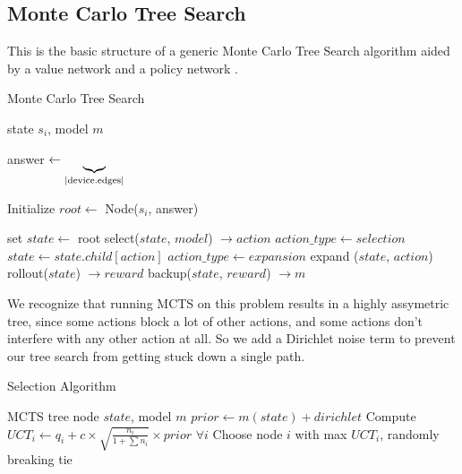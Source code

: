 \documentclass[%
 reprint,
 amsmath,amssymb,
 aps,
]{revtex4-2}
\begin{document}
\subsection{\label{sec:method-mcts}Monte Carlo Tree Search}

This is the basic structure of a generic Monte Carlo Tree Search algorithm aided by a value network and a policy network \citep{mcts_alphago}.

\begin{algorithm}[H]
    \caption{Monte Carlo Tree Search}
    \label{algmcts}
    \begin{algorithmic}
         state $s_i$, model $m$

        answer $\leftarrow \underbrace{\vrule width0pt depth \dimexpr\dp0 + .3ex\relax\copy0}_{\textrm{|device.edges|}}$

        \STATE Initialize $root \leftarrow$ Node($s_i$, answer)

        \STATE set $state \leftarrow$ root
        \REPEAT
        \STATE select($state$, $model$) $\rightarrow action$
        \STATE $action\_type \leftarrow selection$
        \STATE $state \leftarrow state.child[action]$
        \ELSE
        \STATE $action\_type \leftarrow expansion$
        \STATE expand ($state$, $action$)
        \ENDIF
        \STATE rollout($state$) $\rightarrow reward$
        \STATE backup($state$, $reward$) $\rightarrow m$
        \ENDFOR
    \end{algorithmic}
\end{algorithm}

We recognize that running MCTS on this problem results in a highly assymetric tree, since some actions block a lot of other actions, and some actions don't interfere with any other action at all. So we add a Dirichlet noise term to prevent our tree search from getting stuck down a single path. \citep{mcts_assymetric}

\begin{algorithm}[H]
    \caption{Selection Algorithm}
    \begin{algorithmic}
         MCTS tree node $state$, model $m$
        \STATE $prior \leftarrow m(state) + dirichlet$
        \STATE Compute $UCT_i \leftarrow q_i + c \times \sqrt{\frac{n_i}{1 + \sum n_i}} \times prior$ $\forall i$
        \STATE Choose node $i$ with max $UCT_i$, randomly breaking tie
    \end{algorithmic}
\end{algorithm}
\end{document}
